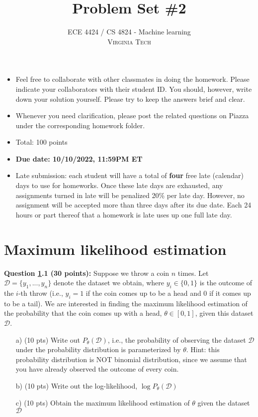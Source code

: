 \documentclass[12pt]{article}
\title{Problem Set \#2} %
\author{ECE 4424 / CS 4824 - Machine learning\\ %
\textsc{Virginia Tech}
}
\begin{document}


\setlength{\droptitle}{-5em}    
\maketitle


\begin{itemize}
    \item Feel free to collaborate with other classmates in doing the homework. Please indicate your collaborators with their student ID. You should, however, write down your solution yourself. Please try to keep the answers brief and clear.
    \item Whenever you need clarification, please post the related questions on Piazza under the corresponding homework folder.
    \item Total: 100 points
    \item \textbf{Due date: 10/10/2022, 11:59PM ET}
    \item Late submission: each student will have a total of \textbf{four} free late (calendar) days to use for homeworks. Once these late days are exhausted, any assignments turned in late will be penalized 20\% per late day. However, no assignment will be accepted more than three days after its due date. Each 24 hours or part thereof that a homework is late uses up one full late day. 
\end{itemize}



\section{Maximum likelihood estimation}
\label{sec:sl}

\textbf{Question \ref{sec:sl}.1 (30 points):} Suppose we throw a coin $n$ times. Let $\mathcal{D}=\{y_1,...,y_n\}$ denote the dataset we obtain, where $y_i\in\{0,1\}$ is the outcome of the $i$-th throw (i.e., $y_i=1$ if the coin comes up to be a head and 0 if it comes up to be a tail). We are interested in finding the maximum likelihood estimation of the probability that the coin comes up with a head, $\theta\in[0,1]$, given this dataset $\mathcal{D}$.
\begin{itemize}
    \item[a)] (10 pts) Write out $P_\theta(\mathcal{D})$, i.e., the probability of observing the dataset $\mathcal{D}$ under the probability distribution is parameterized by $\theta$. Hint: this probability distribution is NOT binomial distribution, since we assume that you have already observed the outcome of every coin.
    \item[b)] (10 pts) Write out the log-likelihood, $\log P_\theta(\mathcal{D})$
    \item[c)] (10 pts) Obtain the maximum likelihood estimation of $\theta$ given the dataset $\mathcal{D}$
\end{itemize}
\end{document}
